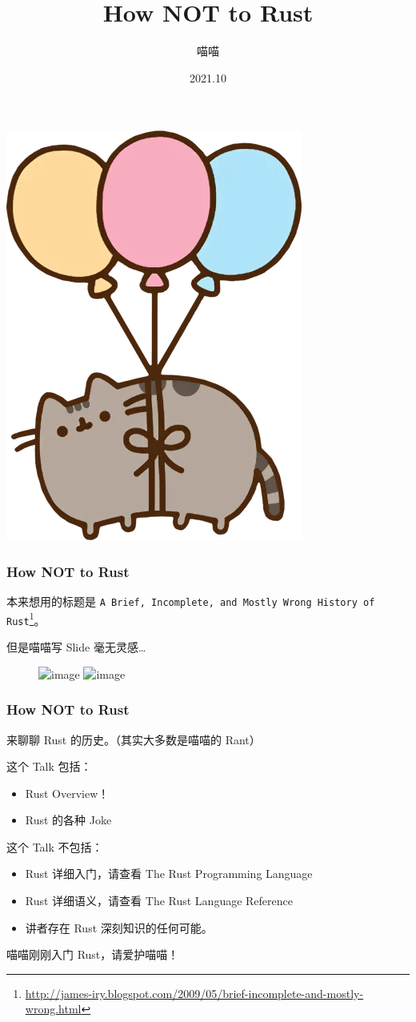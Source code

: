 \documentclass[UTF-8]{ctexbeamer}
\title{How NOT to Rust}
\author{喵喵}
\date{2021.10}
\begin{document}
\begin{frame}
  \titlepage
  \begin{center}
    \includegraphics[width=.1\textwidth]{assets/float.png}
  \end{center}
\end{frame}

\begin{frame}
  \frametitle{How NOT to Rust}

  本来想用的标题是 \texttt{A Brief, Incomplete, and Mostly Wrong History of Rust}\footnote{\url{http://james-iry.blogspot.com/2009/05/brief-incomplete-and-mostly-wrong.html}}。

  \pause
  \vspace{1em}

  但是喵喵写 Slide 毫无灵感\dots

  \begin{figure}
    \includegraphics<2>[width=0.25\textwidth]{assets/avatar.jpg}
    \includegraphics<3>[width=0.5\textwidth]{assets/avatarWD40.png}
  \end{figure}
\end{frame}

\begin{frame}
  \frametitle{How NOT to Rust}

  来聊聊 Rust 的历史。（其实大多数是喵喵的 Rant）

  \pause

  这个 Talk 包括：
  \begin{itemize}
    \item Rust Overview！
    \item Rust 的各种 Joke
  \end{itemize}

  这个 Talk 不包括：
  \begin{itemize}
    \item Rust 详细入门，请查看 The Rust Programming Language
    \item Rust 详细语义，请查看 The Rust Language Reference
    \item 讲者存在 Rust 深刻知识的任何可能。
  \end{itemize}

  \pause

  喵喵刚刚入门 Rust，请爱护喵喵！
\end{frame}
\end{document}
